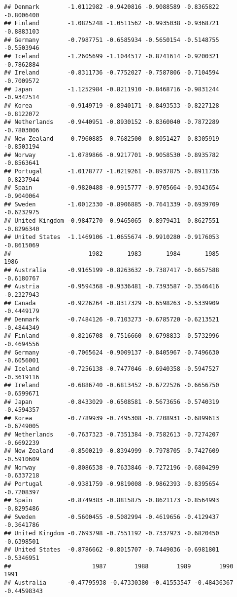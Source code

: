 \documentclass[
]{article}
\begin{document}
\begin{verbatim}
## Denmark        -1.0112982 -0.9420816 -0.9088589 -0.8365822 -0.8006400
## Finland        -1.0825248 -1.0511562 -0.9935038 -0.9368721 -0.8883103
## Germany        -0.7987751 -0.6585934 -0.5650154 -0.5148755 -0.5503946
## Iceland        -1.2605699 -1.1044517 -0.8741614 -0.9200321 -0.7862884
## Ireland        -0.8311736 -0.7752027 -0.7587806 -0.7104594 -0.7009572
## Japan          -1.1252984 -0.8211910 -0.8468716 -0.9831244 -0.9342514
## Korea          -0.9149719 -0.8940171 -0.8493533 -0.8227128 -0.8122072
## Netherlands    -0.9440951 -0.8930152 -0.8360040 -0.7872289 -0.7803006
## New Zealand    -0.7960885 -0.7682500 -0.8051427 -0.8305919 -0.8503194
## Norway         -1.0789866 -0.9217701 -0.9058530 -0.8935782 -0.8563641
## Portugal       -1.0178777 -1.0219261 -0.8937875 -0.8911736 -0.8237944
## Spain          -0.9820488 -0.9915777 -0.9705664 -0.9343654 -0.9040064
## Sweden         -1.0012330 -0.8906885 -0.7641339 -0.6939709 -0.6232975
## United Kingdom -0.9847270 -0.9465065 -0.8979431 -0.8627551 -0.8296340
## United States  -1.1469106 -1.0655674 -0.9910280 -0.9176053 -0.8615069
##                      1982       1983       1984       1985       1986
## Australia      -0.9165199 -0.8263632 -0.7387417 -0.6657588 -0.6180767
## Austria        -0.9594368 -0.9336481 -0.7393587 -0.3546416 -0.2327943
## Canada         -0.9226264 -0.8317329 -0.6598263 -0.5339909 -0.4449179
## Denmark        -0.7484126 -0.7103273 -0.6785720 -0.6213521 -0.4844349
## Finland        -0.8216708 -0.7516660 -0.6798833 -0.5732996 -0.4694556
## Germany        -0.7065624 -0.9009137 -0.8405967 -0.7496630 -0.6056001
## Iceland        -0.7256138 -0.7477046 -0.6940358 -0.5947527 -0.3619116
## Ireland        -0.6886740 -0.6813452 -0.6722526 -0.6656750 -0.6599671
## Japan          -0.8433029 -0.6508581 -0.5673656 -0.5740319 -0.4594357
## Korea          -0.7789939 -0.7495308 -0.7208931 -0.6899613 -0.6749005
## Netherlands    -0.7637323 -0.7351384 -0.7582613 -0.7274207 -0.6692239
## New Zealand    -0.8500219 -0.8394999 -0.7978705 -0.7427609 -0.5910609
## Norway         -0.8086538 -0.7633846 -0.7272196 -0.6804299 -0.6337218
## Portugal       -0.9381759 -0.9819008 -0.9862393 -0.8395654 -0.7208397
## Spain          -0.8749383 -0.8815875 -0.8621173 -0.8564993 -0.8295486
## Sweden         -0.5600455 -0.5082994 -0.4619656 -0.4129437 -0.3641786
## United Kingdom -0.7693798 -0.7551192 -0.7337923 -0.6820450 -0.6398501
## United States  -0.8786662 -0.8015707 -0.7449036 -0.6981801 -0.5346951
##                       1987        1988        1989        1990        1991
## Australia      -0.47795938 -0.47330380 -0.41553547 -0.48436367 -0.44598343

\end{verbatim}
\end{document}
